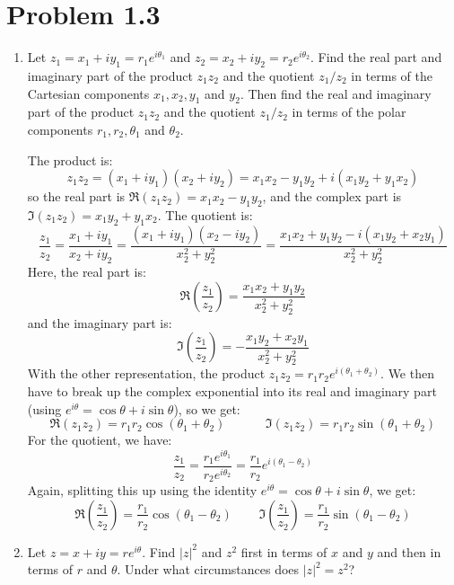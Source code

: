\documentclass[10pt]{article}
\begin{document}
	\section*{Problem 1.3}
	\begin{enumerate}[label=\alph*)]
		\item Let $z_1 = x_1 + iy_1 = r_1e^{i \theta_1}$ and $z_2 = x_2 + iy_2 = r_2e^{i \theta_2}$. Find the 
			real part and imaginary part of the product $z_1z_2$ and the quotient $z_1/z_2$ in terms of the 
			Cartesian components $x_1, x_2, y_1$ and $y_2$. Then find the real and imaginary part of the product
			$z_1z_2$ and the quotient $z_1/z_2$ in terms of the polar components $r_1, r_2, \theta_1$ and 
			$\theta_2$.

			\begin{solution}
				The product is:
				\[z_1z_2 = (x_1 + iy_1)(x_2 + iy_2) = x_1x_2 - y_1y_2 + i(x_1y_2 + y_1x_2)\]
				so the real part is $\Re(z_1z_2) = x_1x_2 - y_1y_2$, and the complex part is
				$\Im(z_1z_2) = x_1y_2 +y_1x_2$. The quotient is:
				\[
				\frac{z_1}{z_2} = \frac{x_1 + iy_1}{x_2 + iy_2} = \frac{(x_1 + iy_1)(x_2 - iy_2)}{x_2^2 + y_2^2}
				= \frac{x_1x_2 + y_1y_2 -i(x_1y_2 + x_2y_1)}{x_2^2 + y_2^2}
				\] 
				Here, the real part is: 
				\[
				\Re\left( \frac{z_1}{z_2} \right) =  \frac{x_1x_2 + y_1y_2}{x_2^2 + y_2^2}
				\] 
				and the imaginary part is:
				\[
				\Im\left( \frac{z_1}{z_2} \right) =	-\frac{x_1y_2 + x_2y_1}{x_2^2 + y_2^2}
				\] 
				With the other representation, the product $z_1z_2 = r_1r_2 e^{i(\theta_1 + \theta_2)}$. We
				then have to break up the complex exponential into its real and imaginary part (using 
				$e^{i \theta} = \cos \theta + i \sin \theta$), so we get:
				\[
					\Re(z_1z_2) = r_1r_2\cos (\theta_1 + \theta_2) \phantom{aaaaaa} \Im(z_1z_2) = r_1r_2
					\sin(\theta_1 + \theta_2)
				\] 
				For the quotient, we have:
				\[
					\frac{z_1}{z_2} = \frac{r_1e^{i \theta_1}}{r_2e^{i \theta_2}} = \frac{r_1}{r_2}e^{i (\theta_1 - \theta_2)}
				\] 
				Again, splitting this up using the identity $e^{i \theta} = \cos \theta + i \sin \theta$, we 
				get:
				\[
					\Re\left(\frac{z_1}{z_2}\right) = \frac{r_1}{r_2}\cos(\theta_1 - \theta_2) \phantom{aaaa}
					\Im\left(\frac{z_1}{z_2}\right) = \frac{r_1}{r_2}\sin(\theta_1 - \theta_2)
				\] 
			\end{solution}
		\item Let $z = x+ iy = re^{i \theta}$. Find $|z|^2$ and $z^2$ first in terms of $x$ and $y$ and then 
			in terms of $r$ and $\theta$. Under what circumstances does $|z|^2 = z^2$?


\end{enumerate}
\end{document}

